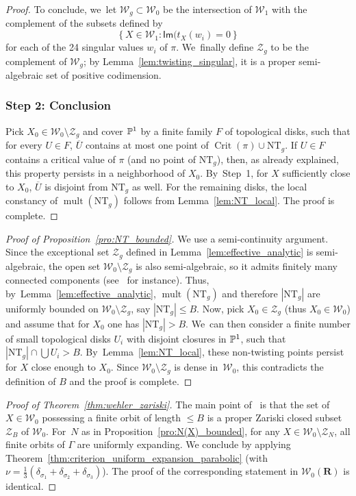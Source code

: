 \documentclass[11pt]{article}
\let\sep :
\newcommand{\set}[1]{\left\{#1\right\}}
\newcommand{\abs}[1]{\left\vert#1\right\vert}
\newcommand{\unsur}[1]{\frac{1}{#1}}
\DeclareMathOperator{\mult}{mult}
\DeclareMathOperator{\Crit}{Crit}
\def\R{\mathbf{R}}
\newcommand{\cW}{\mathcal{W}}
\newcommand{\NT}{{\mathrm{NT}}}
\newcommand{\Ima}{{\mathsf{Im}}}
\theoremstyle{plain}
\theoremstyle{definition}
\numberwithin{equation}{section}
\begin{document}
\begin{proof}
To conclude, we~let $ \cW_g\subset \cW_0$ be
the intersection of $ \cW_1$ with the complement of the subsets defined by
\begin{equation*}
\set{X\in \cW_1\sep \Ima(t_X(w_i) = 0}
\end{equation*} for each of the 24 singular values $w_i$ of $\pi$. We~finally define $\mathcal Z_g$ to be the complement of $ \cW_g$; by Lemma~\ref{lem:twisting_singular}, it is a proper
semi-algebraic set of positive codimension.

\subsubsection*{Step 2: Conclusion}
Pick $X_0\in \cW_0\setminus \mathcal Z_g$ and cover $\P^1$ by a finite family $F$ of
topological disks, such that for every $U\in F$,
$\overline U$ contains at most one point of $\Crit(\pi)\cup \NT_g$.
If $U\in F$ contains a critical value of $\pi$ (and no point of $\NT_g$),
then, as already explained, this property persists in a neighborhood of $X_0$. By~Step~1, for
$X$ sufficiently
close to $X_0$, $\overline U$ is disjoint from $\NT_g$ as well. For the remaining disks, the local constancy of $\mult(\NT_g)$ follows from Lemma~\ref{lem:NT_local}. The proof is complete.
\end{proof}

\begin{proof}[Proof of Proposition~\ref{pro:NT_bounded}]
We use a semi-continuity argument.
Since the exceptional set $\mathcal Z_g$ defined in Lemma~\ref{lem:effective_analytic} is semi-algebraic,
the open set $\cW_0\setminus \mathcal Z_g$ is also semi-algebraic, so it
admits finitely many connected components (see~\cite[Cor.\,2.7]{bierstone-milman:ihes} for instance).
Thus, by~Lemma~\ref{lem:effective_analytic}, $\mult(\NT_g)$ and therefore $\abs{\NT_g}$
are uniformly bounded
on $\cW_0\setminus \mathcal Z_g$, say $\abs{\NT_g}\leq B$. Now, pick $X_0\in \mathcal Z_g$ (thus $X_0\in \cW_0$) and assume
that for $X_0$ one has $\abs{\NT_g}>B$. We~can then consider a finite number of small topological
disks $U_i$ with disjoint closures in $\P^1$, such that $\abs{\NT_g}\cap \bigcup U_i>B$. By~Lemma~\ref{lem:NT_local}, these non-twisting points persist for
$X$ close enough to $X_0$. Since $\cW_0\setminus \mathcal Z_g$ is dense in~$\cW_0$, this
contradicts the definition of $B$ and the proof is complete.
\end{proof}

\begin{proof}[Proof of Theorem~\ref{thm:wehler_zariski}]
The main point of~\cite[Th.\,A]{finite_orbits} is
that the set of $X\in \cW_0$ possessing a finite orbit of length $\leq B$ is a
proper Zariski closed subset $\mathcal Z_B$ of $ \cW_0$. For~$N$ as in
Proposition~\ref{pro:N(X)_bounded}, for
any $X\in \cW_0\setminus \mathcal Z_N$, all finite orbits of $\Gamma$ are uniformly expanding. We
conclude by applying Theorem~\ref{thm:criterion_uniform_expansion_parabolic} (with $\nu = \unsur{3}(\delta_{\sigma_1}+ \delta_{\sigma_2}+\delta_{\sigma_3})$). The proof of the corresponding statement in $ \cW_0(\R)$ is identical.
\end{proof}
\end{document}
